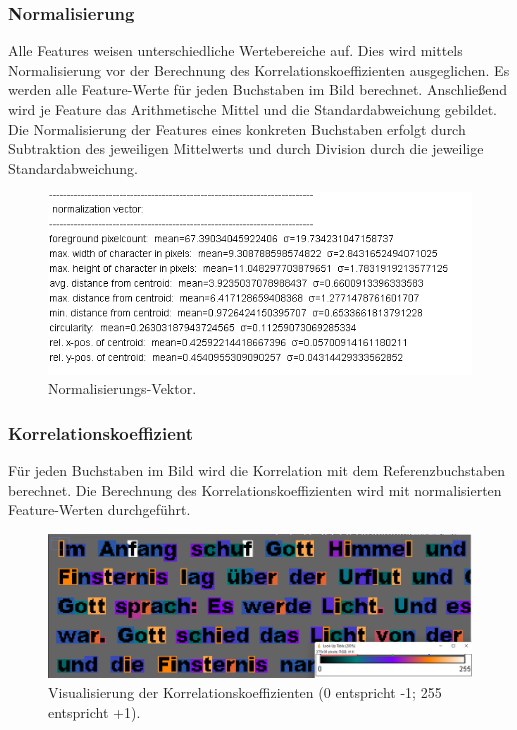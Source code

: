 \documentclass[german,notitlepage,smartquotes]{hgbreport}
\begin{document}
\subsubsection{Normalisierung}

Alle Features weisen unterschiedliche Wertebereiche auf. Dies wird mittels Normalisierung vor der Berechnung des Korrelationskoeffizienten ausgeglichen. Es werden alle Feature-Werte für jeden Buchstaben im Bild berechnet. Anschließend wird je Feature das Arithmetische Mittel und die Standardabweichung gebildet. Die Normalisierung der Features eines konkreten Buchstaben erfolgt durch Subtraktion des jeweiligen Mittelwerts und durch Division durch die jeweilige Standardabweichung.

\begin{figure}[h]
\centering
\includegraphics[width=.85\textwidth]{norm_vect}
\caption{Normalisierungs-Vektor.}
\label{fig:norm_vect}
\end{figure}

\subsubsection{Korrelationskoeffizient}

Für jeden Buchstaben im Bild wird die Korrelation mit dem Referenzbuchstaben berechnet. Die Berechnung des Korrelationskoeffizienten wird mit normalisierten Feature-Werten durchgeführt.

\begin{figure}[h]
\centering
\includegraphics[width=.85\textwidth]{correlation_coeff}
\caption{Visualisierung der Korrelationskoeffizienten (0 entspricht -1; 255 entspricht +1).}
\label{fig:correlation_coeff}
\end{figure}
\end{document}
